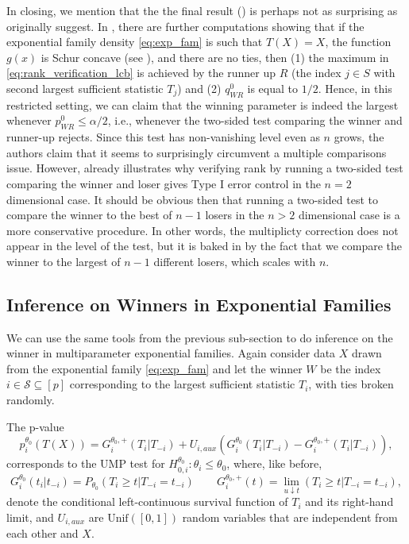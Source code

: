 \documentclass{article}
\begin{document}
In closing, we mention that the the final result () is perhaps not as surprising as \cite{Hung2019} originally suggest. In \cite{Hung2019}, there are further computations showing that if the exponential family density \eqref{eq:exp_fam} is such that $T(X) = X$, the function $g(x)$ is Schur concave (see \cite[Definition 2]{Hung2019}), and there are no ties, then (1) the maximum in \eqref{eq:rank_verification_lcb} is achieved by the runner up $R$ (the index $j \in S$ with second largest sufficient statistic $T_j$) and (2) $q^{0}_{WR}$ is equal to $1/2$. Hence, in this restricted setting, we can claim that the winning parameter is indeed the largest whenever $p^{0}_{WR} \leq \alpha/2$, i.e., whenever the two-sided test comparing the winner and runner-up rejects. Since this test has non-vanishing level even as $n$ grows, the authors claim that it seems to surprisingly circumvent a multiple comparisons issue. However,  already illustrates why verifying rank by running a two-sided test comparing the winner and loser gives Type I error control in the $n=2$ dimensional case. It should be obvious then that running a two-sided test to compare the winner to the best of $n-1$ losers in the $n > 2$ dimensional case is a more conservative procedure. In other words, the multiplicty correction does not appear in the level of the test, but it is baked in by the fact that we compare the winner to the largest of $n-1$ different losers, which scales with $n$. 

\subsection{Inference on Winners in Exponential Families}

We can use the same tools from the previous sub-section  to do inference on the winner in multiparameter exponential families. Again consider data $X$ drawn from the exponential family \eqref{eq:exp_fam} and let the winner $W$ be the index $i \in \mathcal{S} \subseteq [p]$ corresponding to the largest sufficient statistic $T_i$, with ties broken randomly.

The p-value 
\begin{equation}
    \label{eq:ump_exp_fam}
    p_i^{\theta_0}(T(X)) = G^{\theta_0, +}_i(T_i|T_{-i}) + U_{i, aux}(G^{\theta_0}_i(T_i|T_{-i}) - G^{\theta_0, +}_i(T_i|T_{-i})),
\end{equation}
corresponds to the UMP test for $H_{0, i}^{\theta_0}: \theta_i \leq \theta_0$, where, like before,
\begin{equation*}
    G^{\theta_0}_i(t_i | t_{-i}) = P_{\theta_0}(T_i \geq t | T_{-i} = t_{-i}) \qquad G^{\theta_0, +}_i(t) = \lim_{u \downarrow t}(T_i \geq t | T_{-i} = t_{-i} ),
\end{equation*}
denote the conditional left-continuous survival function of $T_i$ and its right-hand limit, and $U_{i, aux}$ are $\text{Unif}([0,1])$ random variables that are independent from each other and $X$.
\end{document}
